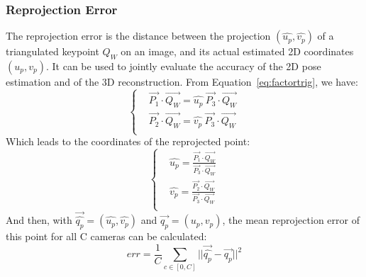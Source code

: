 

\subsubsection{Reprojection Error}  

The reprojection error is the distance between the projection $(\widehat{u_p}, \widehat{v_p})$ of a triangulated keypoint $Q_W$ on an image, and its actual estimated 2D coordinates $(u_p, v_p)$. It can be used to jointly evaluate the accuracy of the 2D pose estimation and of the 3D reconstruction. From Equation~\ref{eq:factortrig}, we have:
\begin{equation}
    \begin{cases}
      &  \overrightarrow{P_1}\cdot \overrightarrow{Q_W} = \widehat{u_p} \ \overrightarrow{P_3} \cdot \overrightarrow{Q_W}\\
      &  \overrightarrow{P_2} \cdot \overrightarrow{Q_W} = \widehat{v_p} \ \overrightarrow{P_3} \cdot \overrightarrow{Q_W}\\
    \end{cases}
\end{equation}
Which leads to the coordinates of the reprojected point:
\begin{equation}
    \begin{cases}
      & \widehat{u_p} = \frac{\overrightarrow{P_1}\cdot \overrightarrow{Q_W}}{\overrightarrow{P_3} \cdot \overrightarrow{Q_W}}\\
      & \widehat{v_p} = \frac{\overrightarrow{P_2}\cdot \overrightarrow{Q_W}}{\overrightarrow{P_3} \cdot \overrightarrow{Q_W}}\\
    \end{cases}
\end{equation}
And then, with $\overrightarrow{\widehat{q_p}} = (\widehat{u_p}, \widehat{v_p})$ and $\overrightarrow{q_p} = (u_p, v_p)$, the mean reprojection error of this point for all C cameras can be calculated:
\begin{equation}
  \boxed{
  err = \frac{1}{C} \sum_{c \in [0,C]} ||\overrightarrow{\widehat{q_p}}-\overrightarrow{q_p}||^2 
  }
\end{equation}

